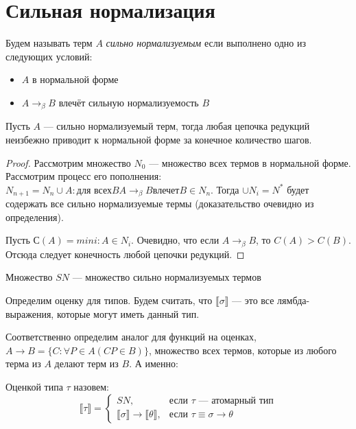 \section{Сильная нормализация}

\begin{definition}
Будем называть терм $A$ \emph{сильно нормализуемым} если
выполнено одно из следующих условий:
\begin{itemize}
\item $A$ в нормальной форме
\item $A\rightarrow_\beta B$ влечёт сильную нормализуемость $B$
\end{itemize}
\end{definition}

\begin{lemma}
Пусть $A$ --- сильно нормализуемый терм, тогда любая цепочка редукций неизбежно 
приводит к нормальной форме за конечное количество шагов.
\end{lemma}

\begin{proof}
Рассмотрим множество $N_0$ --- множество всех термов в нормальной форме.
Рассмотрим процесс его пополнения: $N_{n+1} = N_{n} \cup {A: \mbox{для всех} B A\rightarrow_\beta B \mbox{влечет} B \in N_{n}}$.
Тогда $\cup N_i = N^*$ будет содержать все сильно нормализуемые термы (доказательство очевидно из определения).

Пусть $С(A) = min {i : A \in N_i}$.
Очевидно, что если $A \rightarrow_\beta B$, то $C(A) > C(B)$. Отсюда следует конечность любой цепочки редукций.
\end{proof}

\begin{definition}
Множество $SN$ --- множество сильно нормализуемых термов
\end{definition}

Определим оценку для типов. Будем считать, что $\llbracket \sigma \rrbracket$ --- это все
лямбда-выражения, которые могут иметь данный тип.

Соответственно определим аналог для функций на оценках, $A \rightarrow B = \{ C : \forall P \in A (C P \in B) \}$,
множество всех термов, которые из любого терма из $A$ делают терм из $B$. А именно:

\begin{definition}
Оценкой типа $\tau$ назовем:
$$\llbracket \tau \rrbracket = \left\{\begin{array}{ll} SN,& \mbox{если $\tau$ --- атомарный тип}\\
                                         \llbracket \sigma \rrbracket \rightarrow \llbracket \theta \rrbracket, &\mbox{если $\tau \equiv \sigma\rightarrow\theta$} 
  \end{array}\right.$$
\end{definition}

